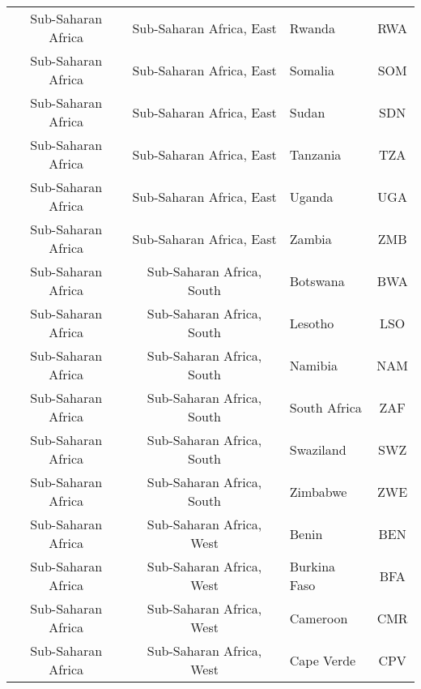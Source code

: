 \begin{landscape}
\begin{longtable}{|c|c|p{5cm}|c|}
            Sub-Saharan Africa &     Sub-Saharan Africa, East &                                            Rwanda &  RWA \\
            Sub-Saharan Africa &     Sub-Saharan Africa, East &                                           Somalia &  SOM \\
            Sub-Saharan Africa &     Sub-Saharan Africa, East &                                             Sudan &  SDN \\
            Sub-Saharan Africa &     Sub-Saharan Africa, East &                                          Tanzania &  TZA \\
            Sub-Saharan Africa &     Sub-Saharan Africa, East &                                            Uganda &  UGA \\
            Sub-Saharan Africa &     Sub-Saharan Africa, East &                                            Zambia &  ZMB \\
            Sub-Saharan Africa &    Sub-Saharan Africa, South &                                          Botswana &  BWA \\
            Sub-Saharan Africa &    Sub-Saharan Africa, South &                                           Lesotho &  LSO \\
            Sub-Saharan Africa &    Sub-Saharan Africa, South &                                           Namibia &  NAM \\
            Sub-Saharan Africa &    Sub-Saharan Africa, South &                                      South Africa &  ZAF \\
            Sub-Saharan Africa &    Sub-Saharan Africa, South &                                         Swaziland &  SWZ \\
            Sub-Saharan Africa &    Sub-Saharan Africa, South &                                          Zimbabwe &  ZWE \\
            Sub-Saharan Africa &     Sub-Saharan Africa, West &                                             Benin &  BEN \\
            Sub-Saharan Africa &     Sub-Saharan Africa, West &                                      Burkina Faso &  BFA \\
            Sub-Saharan Africa &     Sub-Saharan Africa, West &                                          Cameroon &  CMR \\
            Sub-Saharan Africa &     Sub-Saharan Africa, West &                                        Cape Verde &  CPV \\

\end{longtable}
\end{landscape}
